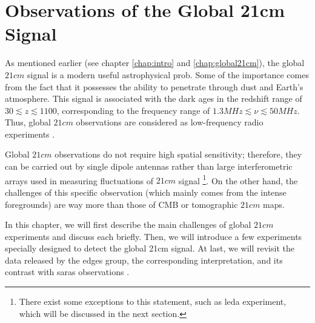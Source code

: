 \documentclass[12pt, TexShade, letterpaper]{report}
\begin{document}
\chapter{Observations of the Global 21cm Signal}
\label{chap:observations}

As mentioned earlier (see chapter \ref{chap:intro} and \ref{chap:global21cm}), the global $21cm$ signal is a modern useful astrophysical prob. Some of the importance comes from the fact that it possesses the ability to penetrate through dust and Earth's atmosphere. This signal is associated with the dark ages in the redshift range of $30 \lesssim z \lesssim 1100$, corresponding to the frequency range of $1.3 MHz\lesssim \nu \lesssim 50 MHz$. Thus, global $21cm$ observations are considered as low-frequency radio experiments \cite{thesis_pamela, thesis_moso}.\par
Global $21cm$ observations do not require high spatial sensitivity; therefore, they can be carried out by single dipole antennas rather than large interferometric arrays used in measuring fluctuations of $21cm$ signal \footnote{There exist some exceptions to this statement, such as \gls{leda} experiment, which will be discussed in the next section.}\cite{thesis_shedding}. On the other hand, the challenges of this specific observation (which mainly comes from the intense foregrounds) are way more than those of CMB or tomographic $21cm$ maps. \par
In this chapter, we will first describe the main challenges of global $21cm$ experiments and discuss each briefly. Then, we will introduce a few experiments specially designed to detect the global 21cm signal. At last, we will revisit the data released by the \gls{edges} group, the corresponding interpretation, and its contrast with \gls{saras} observations \cite{saras_curse_edges}.
\end{document}
